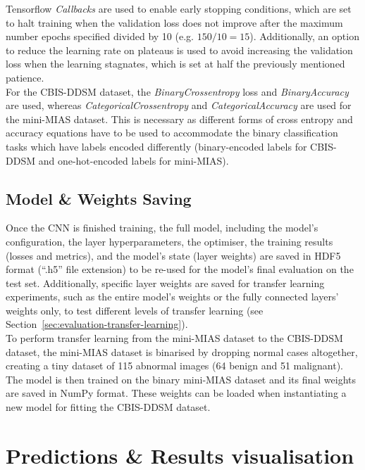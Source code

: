 Tensorflow \textit{Callbacks} are used to enable early stopping conditions, which are set to halt training when the validation loss does not improve after the maximum number epochs specified divided by 10 (e.g. $150/10=15$). Additionally, an option to reduce the learning rate on plateaus is used to avoid increasing the validation loss when the learning stagnates, which is set at half the previously mentioned patience.\\

For the CBIS-DDSM dataset, the \textit{BinaryCrossentropy} loss and \textit{BinaryAccuracy} are used, whereas \textit{CategoricalCrossentropy} and \textit{CategoricalAccuracy} are used for the mini-MIAS dataset. This is necessary as different forms of cross entropy and accuracy equations have to be used to accommodate the binary classification tasks which have labels encoded differently (binary-encoded labels for CBIS-DDSM and one-hot-encoded labels for mini-MIAS).

\subsection{Model \& Weights Saving}
\label{sec:implementation-model-saving-minimiasbinary}

Once the CNN is finished training, the full model, including the model's configuration, the layer hyperparameters, the optimiser, the training results (losses and metrics), and the model's state (layer weights) are saved in HDF5 format (``.h5'' file extension) to be re-used  for the model's final evaluation on the test set. Additionally, specific layer weights are saved for transfer learning experiments, such as the entire model's weights or the fully connected layers' weights only, to test different levels of transfer learning (see Section~\ref{sec:evaluation-transfer-learning}).\\

To perform transfer learning from the mini-MIAS dataset to the CBIS-DDSM dataset, the mini-MIAS dataset is binarised by dropping normal cases altogether, creating a tiny dataset of 115 abnormal images (64 benign and 51 malignant). The model is then trained on the binary mini-MIAS dataset and its final weights are saved in NumPy format. These weights can be loaded when instantiating a new model for fitting the CBIS-DDSM dataset.


\section{Predictions \& Results visualisation}

